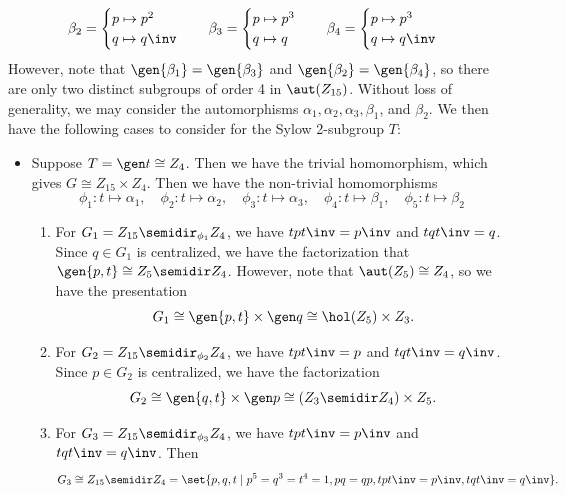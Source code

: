 \begin{solenum}[spsol]
\[        \beta_2 =
        \begin{cases}
            p \mapsto p^2 \\
            q \mapsto q\inv
        \end{cases} \quad
        \beta_3 =
        \begin{cases}
            p \mapsto p^3 \\
            q \mapsto q
        \end{cases} \quad
        \beta_4 =
        \begin{cases}
            p \mapsto p^3 \\
            q \mapsto q\inv
        \end{cases}
	\]
    However, note that $\gen{\beta_1} = \gen{\beta_3}$ and $\gen{\beta_2} = \gen{\beta_4}$, so there are only two distinct subgroups of order 4 in $\aut(Z_{15})$.
	Without loss of generality, we may consider the automorphisms $\alpha_1, \alpha_2, \alpha_3, \beta_1$, and $\beta_2$.
	We then have the following cases to consider for the Sylow 2-subgroup $T$:
    \begin{itemize}
        \item Suppose $T = \gen t \cong Z_4$.
	Then we have the trivial homomorphism, which gives $G \cong Z_{15} \times Z_4$.
	Then we have the non-trivial homomorphisms
        \[
        	\phi_1 : t \mapsto \alpha_1, \quad \phi_2 : t \mapsto \alpha_2, \quad \phi_3 : t \mapsto \alpha_3, \quad \phi_4 : t \mapsto \beta_1, \quad \phi_5 : t \mapsto \beta_2
        \]
        \begin{enumerate}
            \item For $G_1 = Z_{15} \semidir_{\phi_1} Z_4$, we have $tpt\inv = p\inv$ and $tqt\inv = q$.
	Since $q \in G_1$ is centralized, we have the factorization that $\gen{p, t} \cong Z_5 \semidir Z_4$.
	However, note that $\aut(Z_5) \cong Z_4$, so we have the presentation
            \[
            	G_1 \cong \gen{p, t} \times \gen q \cong \hol(Z_5) \times Z_3.
            \]
            \item For $G_2 = Z_{15} \semidir_{\phi_2} Z_4$, we have $tpt\inv = p$ and $tqt\inv = q\inv$.
	Since $p \in G_2$ is centralized, we have the factorization
            \[
            	G_2 \cong \gen{q, t} \times \gen p \cong (Z_3 \semidir Z_4) \times Z_5.
            \]
            \item For $G_3 = Z_{15} \semidir_{\phi_3} Z_4$, we have $tpt\inv = p\inv$ and $tqt\inv = q\inv$.
	Then
            \[
            	G_3 \cong Z_{15} \semidir Z_4 = \set{p, q, t \mid p^5 = q^3 = t^4 = 1, pq = qp, tpt\inv = p\inv, tqt\inv = q\inv}.
\]
\end{enumerate}
\end{itemize}
\end{solenum}

